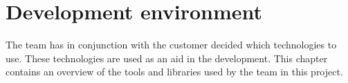 \chapter{Development environment}
The team has in conjunction with the customer decided which technologies to use. These technologies are used as an aid in the development. 
This chapter contains an overview of the tools and libraries used by the team in this project.
\newpage





